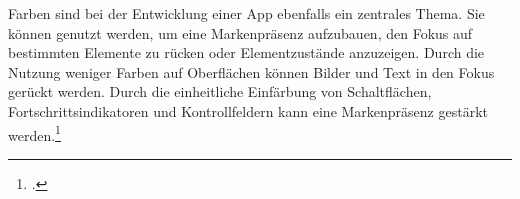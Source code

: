Farben sind bei der Entwicklung einer App ebenfalls ein zentrales Thema. Sie können genutzt werden, um eine Markenpräsenz aufzubauen, den Fokus auf bestimmten Elemente zu rücken oder Elementzustände anzuzeigen. Durch die Nutzung weniger Farben auf Oberflächen können Bilder und Text in den Fokus gerückt werden. Durch die einheitliche Einfärbung von Schaltflächen, Fortschrittsindikatoren und Kontrollfeldern kann eine Markenpräsenz gestärkt werden.\footcite[Vgl.][]{MaterialColor2021}

\clearpage